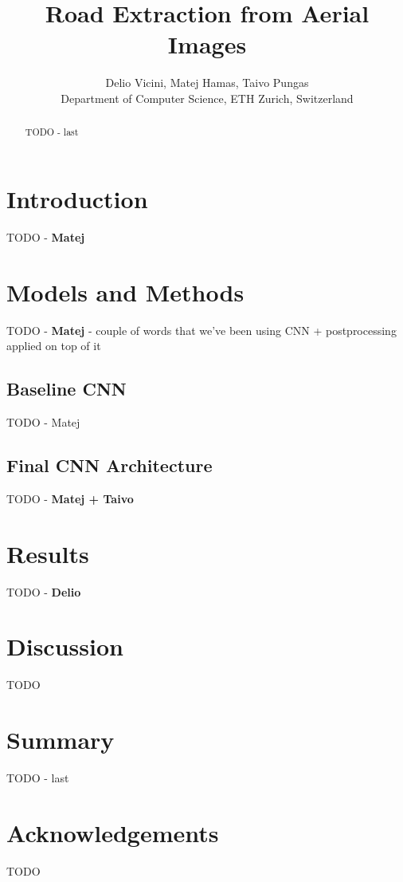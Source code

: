 \documentclass[10pt,conference,compsocconf]{IEEEtran}
\begin{document}
\title{Road Extraction from Aerial Images}
\author{
  Delio Vicini, Matej Hamas, Taivo Pungas\\
  Department of Computer Science, ETH Zurich, Switzerland
}

\maketitle

\begin{abstract}
  TODO - last
\end{abstract}

\section{Introduction}
\label{sec:intro}
TODO - \textbf{Matej}


\section{Models and Methods}
\label{sec:MM}
TODO - \textbf{Matej} - couple of words that we've been using CNN + postprocessing applied on top of it

\subsection{Baseline CNN}
\label{subsec:baselineCNN}
TODO - Matej

\subsection{Final CNN Architecture}
\label{subsec:CNN}
TODO - \textbf{Matej + Taivo}
\section{Results}
\label{sec:results}
TODO - \textbf{Delio}

\section{Discussion}
\label{sec:discussion}
TODO

\section{Summary}
\label{sec:summary}
TODO - last

\section*{Acknowledgements}
TODO



\end{document}
